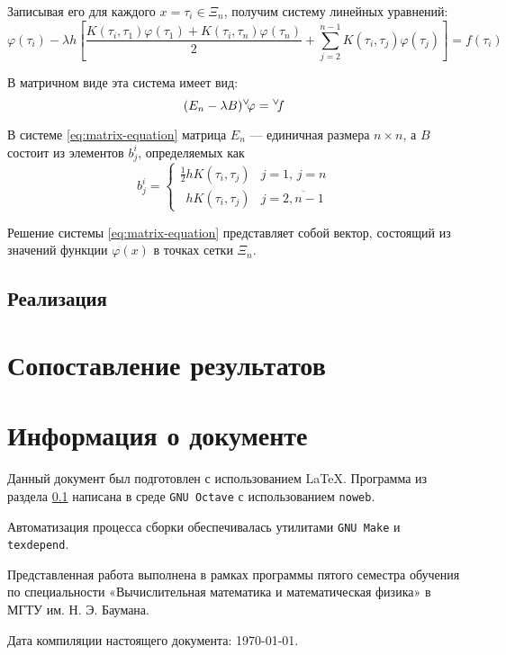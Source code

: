 \documentclass{article}
\numberwithin{equation}{section}
\renewcommand{\phi}{\varphi}
\renewcommand{\vec}[1]{{}^{\vee}\negmedspace#1}
\providecommand{\program}[1]{{\tt #1}}
\begin{document}
Записывая его для каждого $x = \tau_i \in \Xi_n$, получим систему линейных
уравнений:
\begin{equation*}
  \phi(\tau_i) - \lambda h \left[ 
    \frac{K(\tau_i,\tau_1) \phi(\tau_1) + 
      K(\tau_i,\tau_n) \phi(\tau_n)}{2} + 
    \sum_{j=2}^{n-1} K(\tau_i, \tau_{j}) \phi(\tau_{j}) 
  \right] = f(\tau_i)
\end{equation*}

В матричном виде эта система имеет вид:
\begin{equation}
  \label{eq:matrix-equation}
  (E_n-\lambda B) \vec{\phi} = \vec{f}
\end{equation}

В системе \eqref{eq:matrix-equation} матрица $E_n$ — единичная размера
$n×n$, а $B$ состоит из элементов $b_j^i$, определяемых как
\begin{equation}
  \label{eq:B-matrix-element}
  b_j^i =
  \begin{cases}
    \frac{1}{2}hK(\tau_i, \tau_j) & j = 1,\, j = n \\
    \phantom{\frac{1}{2}} hK(\tau_i, \tau_j) & j = \overline{2,n-1}
  \end{cases}
\end{equation}

Решение системы \eqref{eq:matrix-equation} представляет собой вектор,
состоящий из значений функции $\phi(x)$ в точках сетки $\Xi_n$.

\subsection{Реализация}
\label{sec:numeric-implementation}




\section{Сопоставление результатов}
\label{sec:comparison}


\clearpage
\appendix
\section{Информация о документе}

Данный документ был подготовлен с использованием \LaTeX{}. Программа
из раздела \ref{sec:numeric-implementation} написана в среде
\program{GNU Octave} с использованием \program{noweb}.

Автоматизация процесса сборки обеспечивалась утилитами
\program{GNU Make} и \program{texdepend}.

Представленная работа выполнена в рамках программы пятого семестра
обучения по специальности «Вычислительная математика и математическая
физика» в МГТУ им. Н. Э. Баумана.

Дата компиляции настоящего документа: \today.



\end{document}
